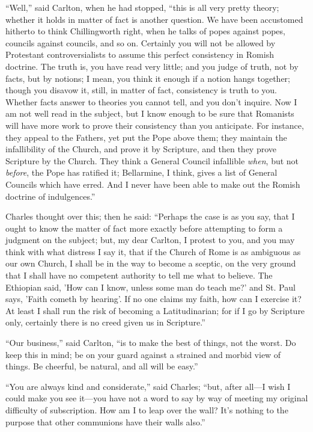 ``Well,'' said Carlton, when he had stopped, ``this is
all very pretty theory; whether it holds in matter of fact is another
question. We have been accustomed hitherto to think Chillingworth
right, when he talks of popes against popes, councils against
councils, and so on. Certainly you will not be allowed by Protestant
controversialists to assume this perfect consistency in Romish
doctrine. The truth is, you have read very little; and you judge of
truth, not by facts, but by notions; I mean, you think it enough if a
notion hangs together; though you disavow it, still, in matter of
fact, consistency is truth to you. Whether facts answer to theories
you cannot tell, and you don't inquire. Now I am not well read in the
subject, but I know enough to be sure that Romanists will have more
work to prove their consistency than you anticipate. For instance,
they appeal to the Fathers, yet put the Pope above them; they maintain
the infallibility of the Church, and prove it by Scripture, and then
they prove Scripture by the Church. They think a General Council
infallible \emph{when}, but not \emph{before}, the Pope has ratified it; Bellarmine,
I think, gives a list of General Councils which have erred. And I
never have been able to make out the Romish doctrine of
indulgences.''

Charles thought over this; then he said: ``Perhaps the
case is as you say, that I ought to know the matter of fact more
exactly before attempting to form a judgment on the subject; but, my
dear Carlton, I protest to you, and you may think with what distress I
say it, that if the Church of Rome is as ambiguous as our own Church,
I shall be in the way to become a sceptic, on the very ground that I
shall have no competent authority to tell me what to believe. The
Ethiopian said, 'How can I know, unless some man do teach me?' and St.
Paul says, 'Faith cometh by hearing'. If no one claims my faith, how
can I exercise it? At least I shall run the risk of becoming a
Latitudinarian; for if I go by Scripture only, certainly there is no
creed given us in Scripture.''

``Our business,'' said Carlton, ``is to make the best
of things, not the worst. Do keep this in mind; be on your guard
against a strained and morbid view of things. Be cheerful, be natural,
and all will be easy.''

``You are always kind and considerate,'' said Charles;
``but, after all—I wish I could make you see it—you have not a
word to say by way of meeting my original difficulty of subscription.
How am I to leap over the wall? It's nothing to the purpose that other
communions have their walls also.''

